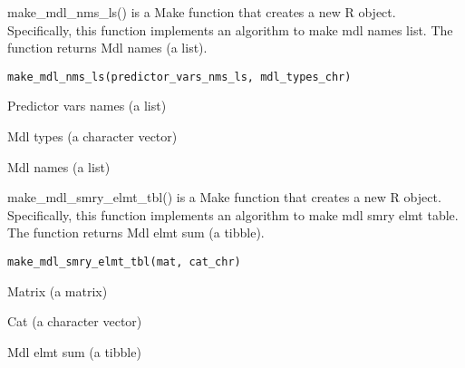 \documentclass[a4paper]{book}
\begin{document}
%
\begin{Description}\relax
make\_mdl\_nms\_ls() is a Make function that creates a new R object. Specifically, this function implements an algorithm to make mdl names list. The function returns Mdl names (a list).
\end{Description}
%
\begin{Usage}
\begin{verbatim}
make_mdl_nms_ls(predictor_vars_nms_ls, mdl_types_chr)
\end{verbatim}
\end{Usage}
%
\begin{Arguments}
\begin{ldescription}
\item[\code{predictor\_vars\_nms\_ls}] Predictor vars names (a list)

\item[\code{mdl\_types\_chr}] Mdl types (a character vector)
\end{ldescription}
\end{Arguments}
%
\begin{Value}
Mdl names (a list)
\end{Value}
%
\begin{Description}\relax
make\_mdl\_smry\_elmt\_tbl() is a Make function that creates a new R object. Specifically, this function implements an algorithm to make mdl smry elmt table. The function returns Mdl elmt sum (a tibble).
\end{Description}
%
\begin{Usage}
\begin{verbatim}
make_mdl_smry_elmt_tbl(mat, cat_chr)
\end{verbatim}
\end{Usage}
%
\begin{Arguments}
\begin{ldescription}
\item[\code{mat}] Matrix (a matrix)

\item[\code{cat\_chr}] Cat (a character vector)
\end{ldescription}
\end{Arguments}
%
\begin{Value}
Mdl elmt sum (a tibble)
\end{Value}
\end{document}
